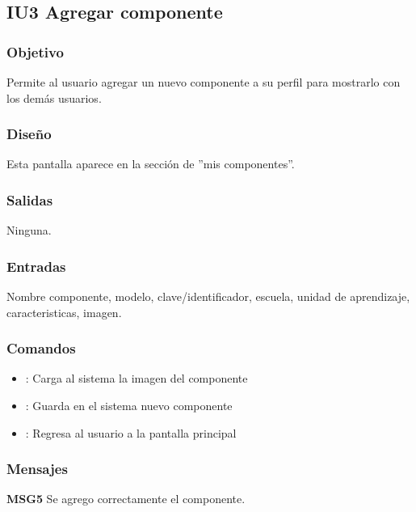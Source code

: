 \subsection{IU3 Agregar componente}

\subsubsection{Objetivo}
	Permite al usuario agregar un nuevo componente a su perfil para mostrarlo con los dem\'as usuarios.

\subsubsection{Diseño}
	Esta pantalla aparece en la sección de ''mis componentes''. 


\subsubsection{Salidas}

	Ninguna.

\subsubsection{Entradas}
Nombre componente, modelo, clave/identificador, escuela, unidad de aprendizaje, caracteristicas, imagen.

\subsubsection{Comandos}
\begin{itemize}
	\item {}: Carga al sistema la imagen del componente
	
	
	\item {}: Guarda en el sistema nuevo componente
	\item {}: Regresa al usuario a la pantalla principal
	
\end{itemize}

\subsubsection{Mensajes}
	\begin{Citemize}
		\item {\bf MSG5} Se agrego correctamente el componente.
	\end{Citemize}